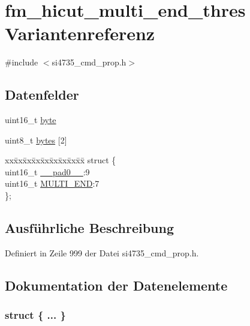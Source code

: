 \hypertarget{unionfm__hicut__multi__end__thres}{}\section{fm\+\_\+hicut\+\_\+multi\+\_\+end\+\_\+thres Variantenreferenz}
\label{unionfm__hicut__multi__end__thres}


{\ttfamily \#include $<$si4735\+\_\+cmd\+\_\+prop.\+h$>$}

\subsection*{Datenfelder}
\begin{DoxyCompactItemize}
\item 
uint16\+\_\+t \hyperlink{unionfm__hicut__multi__end__thres_ab0549c1b5ea980a02e7eab77e21fea49}{byte}
\item 
uint8\+\_\+t \hyperlink{unionfm__hicut__multi__end__thres_a46e4c05d20a047ec169f60d3167e912e}{bytes} \mbox{[}2\mbox{]}
\item 
\begin{tabbing}
xx\=xx\=xx\=xx\=xx\=xx\=xx\=xx\=xx\=\kill
struct \{\\
\>uint16\_t \hyperlink{unionfm__hicut__multi__end__thres_a77132c2c26a75f5b8751b235cda23828}{\_\_pad0\_\_}:9\\
\>uint16\_t \hyperlink{unionfm__hicut__multi__end__thres_a41a4c4055c9b6dc3abd9b7e1d0c77620}{MULTI\_END}:7\\
\}; \\

\end{tabbing}\end{DoxyCompactItemize}


\subsection{Ausführliche Beschreibung}


Definiert in Zeile 999 der Datei si4735\+\_\+cmd\+\_\+prop.\+h.



\subsection{Dokumentation der Datenelemente}
\hypertarget{unionfm__hicut__multi__end__thres_a4c5271c04b2d0f081ded7cb976318918}{}\subsubsection[{"@123}]{\setlength{\rightskip}{0pt plus 5cm}struct \{ ... \} }\label{unionfm__hicut__multi__end__thres_a4c5271c04b2d0f081ded7cb976318918}
\hypertarget{unionfm__hicut__multi__end__thres_a77132c2c26a75f5b8751b235cda23828}{}
